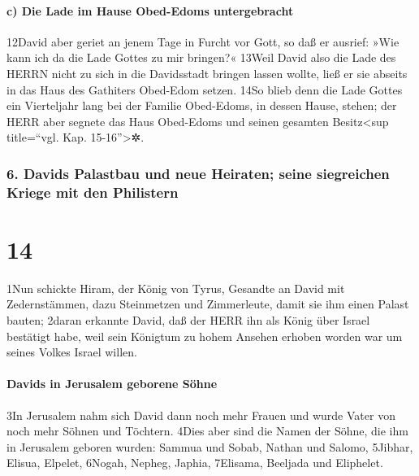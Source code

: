 \hypertarget{c-die-lade-im-hause-obed-edoms-untergebracht}{%
\paragraph{c) Die Lade im Hause Obed-Edoms
untergebracht}\label{c-die-lade-im-hause-obed-edoms-untergebracht}}

12David aber geriet an jenem Tage in Furcht vor Gott, so daß er ausrief:
»Wie kann ich da die Lade Gottes zu mir bringen?« 13Weil David also die
Lade des HERRN nicht zu sich in die Davidsstadt bringen lassen wollte,
ließ er sie abseits in das Haus des Gathiters Obed-Edom setzen. 14So
blieb denn die Lade Gottes ein Vierteljahr lang bei der Familie
Obed-Edoms, in dessen Hause, stehen; der HERR aber segnete das Haus
Obed-Edoms und seinen gesamten Besitz\textless sup title=``vgl. Kap.
15-16''\textgreater✲.

\hypertarget{davids-palastbau-und-neue-heiraten-seine-siegreichen-kriege-mit-den-philistern}{%
\subsubsection{6. Davids Palastbau und neue Heiraten; seine siegreichen
Kriege mit den
Philistern}\label{davids-palastbau-und-neue-heiraten-seine-siegreichen-kriege-mit-den-philistern}}

\hypertarget{section-13}{%
\section{14}\label{section-13}}

1Nun schickte Hiram, der König von Tyrus, Gesandte an David mit
Zedernstämmen, dazu Steinmetzen und Zimmerleute, damit sie ihm einen
Palast bauten; 2daran erkannte David, daß der HERR ihn als König über
Israel bestätigt habe, weil sein Königtum zu hohem Ansehen erhoben
worden war um seines Volkes Israel willen.

\hypertarget{davids-in-jerusalem-geborene-suxf6hne}{%
\paragraph{Davids in Jerusalem geborene
Söhne}\label{davids-in-jerusalem-geborene-suxf6hne}}

3In Jerusalem nahm sich David dann noch mehr Frauen und wurde Vater von
noch mehr Söhnen und Töchtern. 4Dies aber sind die Namen der Söhne, die
ihm in Jerusalem geboren wurden: Sammua und Sobab, Nathan und Salomo,
5Jibhar, Elisua, Elpelet, 6Nogah, Nepheg, Japhia, 7Elisama, Beeljada und
Eliphelet.

